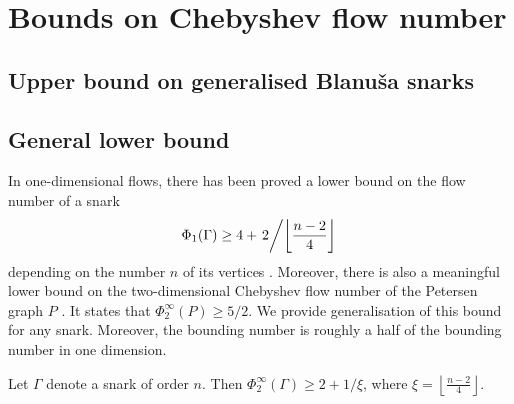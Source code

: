 \chapter{Bounds on Chebyshev flow number} %


\section{Upper bound on generalised Blanuša snarks}

\section{General lower bound}

In one-dimensional flows, there has been proved a lower bound on the flow number of a snark 
\begin{equation*}
	\Phi_1(\Gamma) \geq 4 + \left.2\middle/\left\lfloor\frac{n-2}{4}\right\rfloor\right.
\end{equation*}
depending on the number $n$ of its vertices \cite[p. 14]{cyle_rank}. Moreover, there is also a meaningful lower bound on the two-dimensional Chebyshev flow number of the Petersen graph $P$ \cite[p. 99]{gloria_phd}. It states that $\Phi_2^\infty(P)\geq 5/2$. We provide generalisation of this bound for any snark. Moreover, the bounding number is roughly a half of the bounding number in one dimension.

\begin{proposition}
	Let $\Gamma$ denote a snark of order $n$. Then $\Phi_2^{\infty}(\Gamma) \geq 2+1 / \xi$, where $\xi=\left\lfloor\frac{n-2}{4}\right\rfloor$.
\end{proposition}

